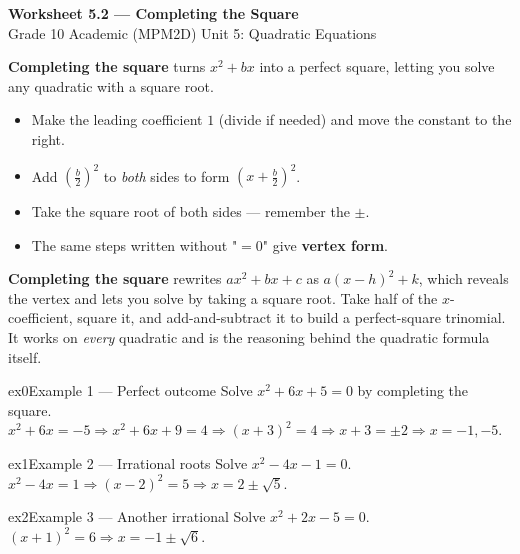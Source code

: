 \documentclass[11pt]{article}
\begin{document}
\begin{center}
{\LARGE\bfseries\color{titleblue}Worksheet 5.2 --- Completing the Square}\\[2pt]
{\small Grade 10 Academic (MPM2D) \textperiodcentered{} Unit 5: Quadratic Equations}
\end{center}

\begin{ideabox}
\textbf{Completing the square} turns $x^2+bx$ into a perfect square, letting you solve any quadratic with a square root.
\begin{itemize}[leftmargin=*,itemsep=2pt]
  \item Make the leading coefficient $1$ (divide if needed) and move the constant to the right.
  \item Add $\left(\tfrac{b}{2}\right)^2$ to \emph{both} sides to form $(x+\tfrac{b}{2})^2$.
  \item Take the square root of both sides --- remember the $\pm$.
  \item The same steps written without "$=0$" give \textbf{vertex form}.
\end{itemize}
\end{ideabox}

\begin{learnbox}
\textbf{Completing the square} rewrites $ax^2+bx+c$ as $a(x-h)^2+k$, which reveals the vertex and lets you solve by taking a square root.
Take half of the $x$-coefficient, square it, and add-and-subtract it to build a perfect-square trinomial.
It works on \emph{every} quadratic and is the reasoning behind the quadratic formula itself.
\end{learnbox}


\begin{example}{ex0}{Example 1 --- Perfect outcome}
Solve $x^2+6x+5=0$ by completing the square.
\soln $x^2+6x=-5\Rightarrow x^2+6x+9=4\Rightarrow (x+3)^2=4\Rightarrow x+3=\pm2\Rightarrow x=-1,-5.$
\end{example}

\begin{example}{ex1}{Example 2 --- Irrational roots}
Solve $x^2-4x-1=0$.
\soln $x^2-4x=1\Rightarrow (x-2)^2=5\Rightarrow x=2\pm\sqrt5.$
\end{example}

\begin{example}{ex2}{Example 3 --- Another irrational}
Solve $x^2+2x-5=0$.
\soln $(x+1)^2=6\Rightarrow x=-1\pm\sqrt6.$
\end{example}
\end{document}
